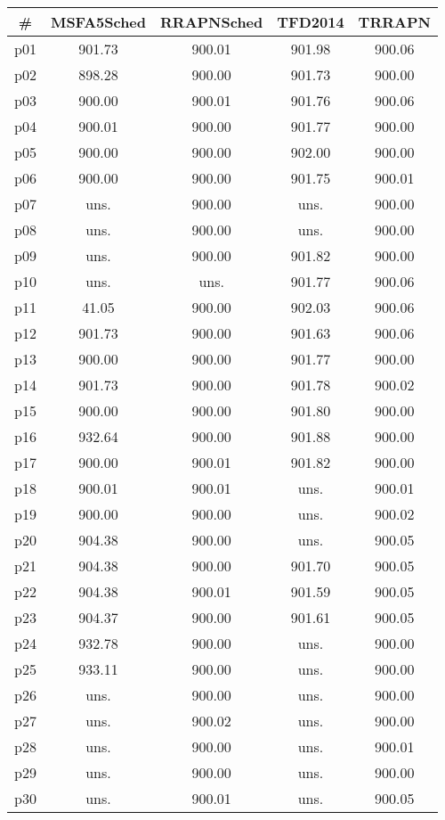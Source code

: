 \begin{tabular}{ccccc}
\toprule
\textbf{\#} & \textbf{MSFA5Sched} & \textbf{RRAPNSched} & \textbf{TFD2014} & \textbf{TRRAPN}\\
\midrule
p01 & 901.73 & 900.01 & 901.98 & 900.06\\
p02 & 898.28 & 900.00 & 901.73 & 900.00\\
p03 & 900.00 & 900.01 & 901.76 & 900.06\\
p04 & 900.01 & 900.00 & 901.77 & 900.00\\
p05 & 900.00 & 900.00 & 902.00 & 900.00\\
p06 & 900.00 & 900.00 & 901.75 & 900.01\\
p07 & uns. & 900.00 & uns. & 900.00\\
p08 & uns. & 900.00 & uns. & 900.00\\
p09 & uns. & 900.00 & 901.82 & 900.00\\
p10 & uns. & uns. & 901.77 & 900.06\\
p11 & 41.05 & 900.00 & 902.03 & 900.06\\
p12 & 901.73 & 900.00 & 901.63 & 900.06\\
p13 & 900.00 & 900.00 & 901.77 & 900.00\\
p14 & 901.73 & 900.00 & 901.78 & 900.02\\
p15 & 900.00 & 900.00 & 901.80 & 900.00\\
p16 & 932.64 & 900.00 & 901.88 & 900.00\\
p17 & 900.00 & 900.01 & 901.82 & 900.00\\
p18 & 900.01 & 900.01 & uns. & 900.01\\
p19 & 900.00 & 900.00 & uns. & 900.02\\
p20 & 904.38 & 900.00 & uns. & 900.05\\
p21 & 904.38 & 900.00 & 901.70 & 900.05\\
p22 & 904.38 & 900.01 & 901.59 & 900.05\\
p23 & 904.37 & 900.00 & 901.61 & 900.05\\
p24 & 932.78 & 900.00 & uns. & 900.00\\
p25 & 933.11 & 900.00 & uns. & 900.00\\
p26 & uns. & 900.00 & uns. & 900.00\\
p27 & uns. & 900.02 & uns. & 900.00\\
p28 & uns. & 900.00 & uns. & 900.01\\
p29 & uns. & 900.00 & uns. & 900.00\\
p30 & uns. & 900.01 & uns. & 900.05\\
\bottomrule
\end{tabular}

